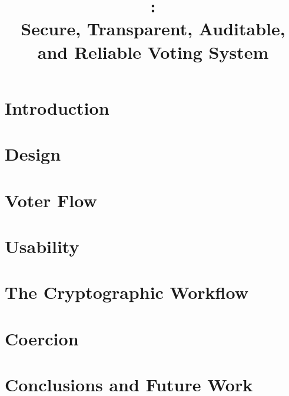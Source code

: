 \documentclass[letterpaper, 10pt, twocolumn]{article}
\title{\projname: \\
Secure, Transparent, Auditable, and Reliable Voting System}
\begin{document}
\maketitle

\begin{abstract}

\end{abstract}

\section{Introduction}


\section{Design}


\section{Voter Flow}


\section{Usability}


\section{The Cryptographic Workflow}


\section{Coercion}


\section{Conclusions and Future Work}




\end{document}

